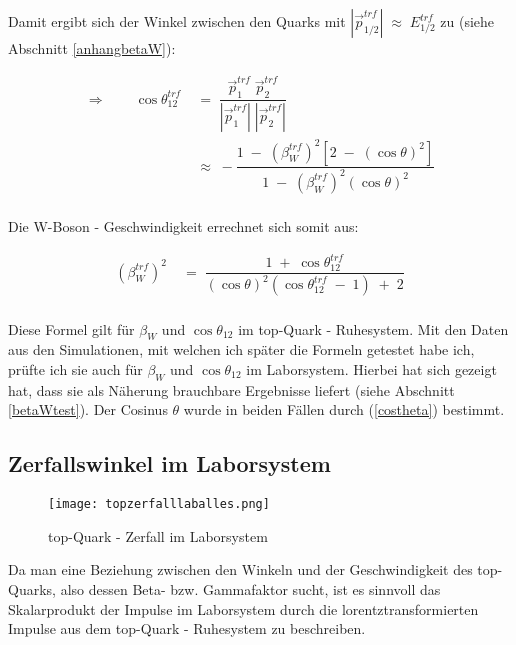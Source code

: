 \documentclass[
a4paper,                                %
twoside,                                %
BCOR1.4cm,                      %
ngerman,                                %
10pt,                           %
headings=normal,                %
headsepline,                    %
clearplainpage, %
final,                                  %
div=14,
parskip=full
]{scrbook}
\begin{document}
Damit ergibt sich der Winkel zwischen den Quarks mit 
$ |\vec{p}_{1/2}^{trf}|\;\approx\;E_{1/2}^{trf} $
 zu (siehe Abschnitt \ref{anhangbetaW}):

\begin{align}
	\Rightarrow \qquad \cos \theta_{1 2}^{trf}
\;&=\;%
	\dfrac{\vec{p}_{1}^{trf}\;\vec{p}_{2}^{trf}}{|\vec{p}_{1}^{trf}|\;|\vec{p}_{2}^{trf}|}
\nonumber
\\
\;&\approx\;
	- \dfrac{1\;-\;\left(\beta_{W}^{trf}\right)^{2} \left[2\;-\;\left(\cos \theta \right)^{2}\right]}
	{1\;-\;\left(\beta_{W}^{trf}\right)^{2} \left(\cos \theta \right)^{2}}
\\
\nonumber
\end{align}

Die W-Boson - Geschwindigkeit errechnet sich somit aus:

\begin{align}
	\left(\beta_{W}^{trf}\right)^{2}
\;&=\;
	\dfrac{1\;+\;\cos \theta_{1 2}^{trf}}
	{\left(\cos \theta \right)^{2} \left(\cos \theta_{1 2}^{trf}\;-\;1\right)\;+\;2}
\label{betaW}
\\
\nonumber
\end{align}

Diese Formel gilt f\"ur $ \beta_{W} $ und $ \cos \theta_{1 2} $ im top-Quark - Ruhesystem. Mit den Daten aus den Simulationen, mit welchen ich sp\"ater die Formeln getestet habe ich, pr\"ufte ich  sie auch f\"ur $ \beta_{W} $ und $ \cos \theta_{1 2} $ im Laborsystem. Hierbei hat sich gezeigt hat, dass sie als N\"aherung brauchbare Ergebnisse liefert (siehe Abschnitt \ref{betaWtest}). 
Der Cosinus $ \theta $ wurde in beiden F\"allen durch (\ref{costheta}) bestimmt.

\subsection{Zerfallswinkel im Laborsystem}

\begin{figure}[h]
	\texttt{[image: topzerfalllaballes.png]}
	\caption{top-Quark - Zerfall im Laborsystem}
\end{figure}

Da man eine Beziehung zwischen den Winkeln und der Geschwindigkeit des top-Quarks, also dessen Beta- bzw. Gammafaktor sucht, ist es sinnvoll das Skalarprodukt der Impulse im Laborsystem durch die lorentztransformierten  Impulse aus dem top-Quark - Ruhesystem zu beschreiben.
\end{document}
